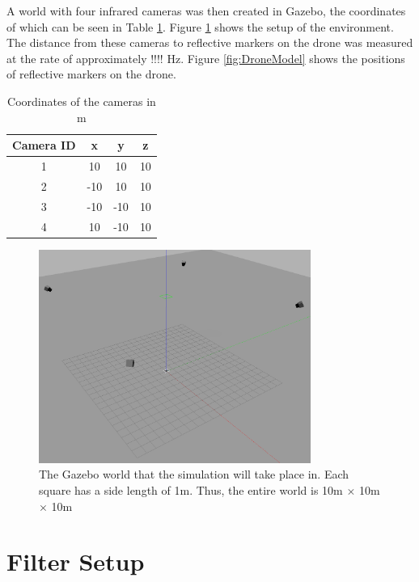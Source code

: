 \documentclass[letterpaper, preprint, paper,11pt]{AAS}	%
\begin{document}
A world with four infrared cameras was then created in Gazebo, the coordinates of which can be seen in Table \ref{tab:cameras}. Figure \ref{fig:GazeboWorld} shows the setup of the environment. The distance from these cameras to reflective markers on the drone was measured at the rate of approximately !!!! Hz. Figure \ref{fig:DroneModel} shows the positions of reflective markers on the drone. 


\begin{table}[htbp]
	\fontsize{10}{10}\selectfont
    \caption{Coordinates of the cameras in m}
   \label{tab:cameras}
        \centering 
   \begin{tabular}{c | c | c | c} %
      \hline 
      Camera ID    & x & y & z \\
      \hline 
      1      & 10 & 10 & 10 \\
      2      & -10 & 10 & 10 \\
      3      & -10 & -10 & 10 \\
      4      & 10 & -10 & 10 \\
      \hline
   \end{tabular}
\end{table}

\begin{figure}[htb]
	\centering\includegraphics[width=3.5in]{Figures/GazeboWorld}
	\caption{The Gazebo world that the simulation will take place in. Each square has a side length of 1m. Thus, the entire world is 10m $\times$ 10m $\times$ 10m}
	\label{fig:GazeboWorld}
\end{figure}

\section{Filter Setup}
\end{document}
